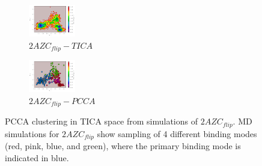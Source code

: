\begin{figure}[!ht]
\centering
\begin{subfigure}{.5\textwidth}
  \centering
  \includegraphics[width=.9\linewidth]{chapter4/2AZC_flip/2AZC_flip-tica.pdf}
  \caption{$2AZC_{flip}-TICA$}
  \label{sup:2AZC_flip-tica}
\end{subfigure}%
\begin{subfigure}{.5\textwidth}
  \centering
  \includegraphics[width=.9\linewidth]{chapter4/2AZC_flip/2AZC_flip-pcca.pdf}
  \caption{$2AZC_{flip}-PCCA$}
  \label{sup:2AZC_flip-pcca}
\end{subfigure}
\caption[PCCA Clustering of $2AZC_{flip}$]{PCCA clustering in TICA space from simulations of $2AZC_{flip}$. MD simulations for $2AZC_{flip}$ show sampling of 4 different binding modes (red, pink, blue, and green), where the primary binding mode is indicated in blue.}
\label{sup:2AZC_flip-cluster}
\end{figure}

